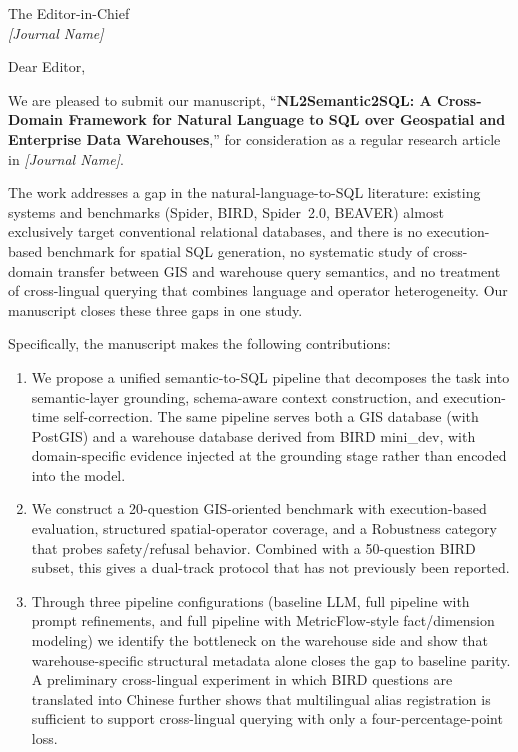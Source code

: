 \documentclass[11pt]{letter}
\begin{document}
\begin{letter}{The Editor-in-Chief \\ \emph{[Journal Name]}}

\opening{Dear Editor,}

We are pleased to submit our manuscript, ``\textbf{NL2Semantic2SQL: A Cross-Domain Framework for Natural Language to SQL over Geospatial and Enterprise Data Warehouses},'' for consideration as a regular research article in \emph{[Journal Name]}.

The work addresses a gap in the natural-language-to-SQL literature: existing systems and benchmarks (Spider, BIRD, Spider~2.0, BEAVER) almost exclusively target conventional relational databases, and there is no execution-based benchmark for spatial SQL generation, no systematic study of cross-domain transfer between GIS and warehouse query semantics, and no treatment of cross-lingual querying that combines language and operator heterogeneity. Our manuscript closes these three gaps in one study.

Specifically, the manuscript makes the following contributions:

\begin{enumerate}
\item We propose a unified semantic-to-SQL pipeline that decomposes the task into semantic-layer grounding, schema-aware context construction, and execution-time self-correction. The same pipeline serves both a GIS database (with PostGIS) and a warehouse database derived from BIRD mini\_dev, with domain-specific evidence injected at the grounding stage rather than encoded into the model.
\item We construct a 20-question GIS-oriented benchmark with execution-based evaluation, structured spatial-operator coverage, and a Robustness category that probes safety/refusal behavior. Combined with a 50-question BIRD subset, this gives a dual-track protocol that has not previously been reported.
\item Through three pipeline configurations (baseline LLM, full pipeline with prompt refinements, and full pipeline with MetricFlow-style fact/dimension modeling) we identify the bottleneck on the warehouse side and show that warehouse-specific structural metadata alone closes the gap to baseline parity. A preliminary cross-lingual experiment in which BIRD questions are translated into Chinese further shows that multilingual alias registration is sufficient to support cross-lingual querying with only a four-percentage-point loss.
\end{enumerate}


\end{letter}
\end{document}

